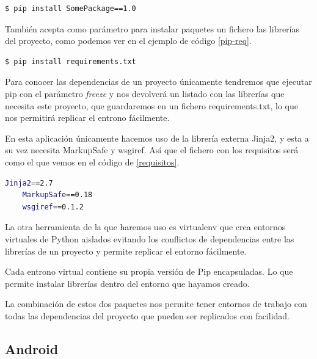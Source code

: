 \begin{lstlisting}[language=bash,label=pip,caption=Instalación de un paquete utilizando pip]
	$ pip install SomePackage==1.0  
\end{lstlisting}

También acepta como parámetro para instalar paquetes un fichero las librerías del proyecto, como podemos ver en el ejemplo de código \ref{pip-req}.\par

\begin{lstlisting}[language=bash,label=pip-req,caption=Instalación de los requisitos de un proyecto utilizando pip]
	$ pip install requirements.txt  
\end{lstlisting}

Para conocer las dependencias de un proyecto únicamente tendremos que ejecutar pip con el parámetro \emph{freeze} y nos devolverá un listado con las librerías que necesita este proyecto, que guardaremos en un fichero requirements.txt, lo que nos permitirá replicar el entrono fácilmente. \par
En esta aplicación únicamente hacemos uso de la librería externa Jinja2, y esta a su vez necesita MarkupSafe y wsgiref. Así que el fichero con los requisitos será como el que vemos en el código de \ref{requisitos}.\par

\begin{lstlisting}[language=bash,label=requisitos,caption=Requisitos del proyecto]
	Jinja2==2.7
	MarkupSafe==0.18
	wsgiref==0.1.2
\end{lstlisting}


La otra herramienta de la que haremos uso es virtualenv  que  crea entornos virtuales de Python aislados evitando los conflictos de dependencias entre las librerías de un proyecto y permite replicar el entorno fácilmente.\par
Cada entrono virtual contiene su propia versión de Pip encapsuladas. Lo que permite instalar librerías dentro del entorno que hayamos creado.\medskip\par

La combinación de estos dos paquetes nos permite tener entornos de trabajo con todas las dependencias del proyecto que pueden ser replicados con facilidad. 

\subsection{Android}

